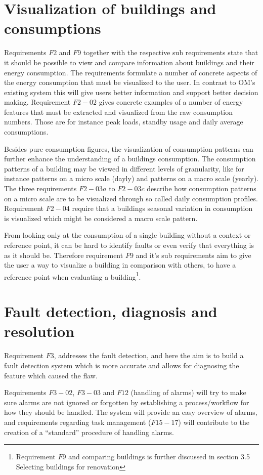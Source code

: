 \section{Visualization of buildings and consumptions}
Requirements $F2$ and $F9$ together with the respective sub requirements state that it should be possible to view and compare information about buildings and their energy consumption. The requirements formulate a number of concrete aspects of the energy consumption that must be visualized to the user. In contrast to OM’s existing system this will give users better information and support better decision making. Requirement $F2-02$ gives concrete examples of a number of energy features that must be extracted and visualized from the raw consumption numbers. Those are for instance peak loads, standby usage and daily average consumptions.

Besides pure consumption figures, the visualization of consumption patterns can further enhance the understanding of a buildings consumption. The consumption patterns of a building may be viewed in different levels of granularity, like for instance patterns on a micro scale (dayly) and patterns on a macro scale (yearly). The three requirements $F2-03a$ to $F2-03c$ describe how consumption patterns on a micro scale are to be visualized through so called daily consumption profiles. Requirement $F2-04$ require that a buildings seasonal variation in consumption is visualized which might be considered a macro scale pattern. 

From looking only at the consumption of a single building without a context or reference point, it can be hard to identify faults or even verify that everything is as it should be. Therefore requirement $F9$ and it's sub requirements aim to give the user a way to visualize a building in comparison with others, to have a reference point when evaluating a building\footnote{Requirement $F9$ and comparing buildings is further discussed in section 3.5 Selecting buildings for renovation}. 
\section{Fault detection, diagnosis and resolution}
Requirement $F3$, addresses the fault detection, and here the aim is to build a fault detection system which is more accurate and allows for diagnosing the feature which caused the flaw. 

Requirements $F3-02$, $F3-03$ and $F12$ (handling of alarms) will try to make sure alarms are not ignored or forgotten by establishing a process/workflow for how they should be handled. The system will provide an easy overview of alarms, and requirements regarding task management ($F15-17$) will contribute to the creation of a “standard” procedure of handling alarms.
